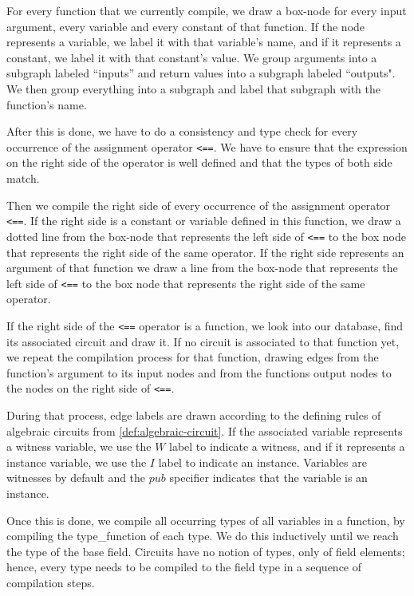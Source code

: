 For every function that we currently compile, we draw a box-node for every input argument, every variable and every constant of that function. If the node represents a variable, we label it with that variable's name, and if it represents a constant, we label it with that constant's value. We group arguments into a subgraph labeled ``inputs'' and return values into a subgraph labeled ``outputs". We then group everything into a subgraph and label that subgraph with the function's name.

After this is done, we have to do a consistency and type check for every occurrence of the assignment operator \texttt{<==}. We have to ensure that the expression on the right side of the operator is well defined and that the types of both side match.

Then we compile the right side of every occurrence of the assignment operator \texttt{<==}. If the right side is a constant or variable defined in this function, we draw a dotted line from the box-node that represents the left side of \texttt{<==} to the box node that represents the right side of the same operator. If the right side represents an argument of that function we draw a line from the box-node that represents the left side of \texttt{<==} to the box node that represents the right side of the same operator. 

If the right side of the \texttt{<==} operator is a function, we look into our database, find its associated circuit and draw it. If no circuit is  associated to that function yet, we repeat the compilation process for that function, drawing edges from the function's argument to its input nodes and from the functions output nodes to the nodes on the right side of \texttt{<==}.

During that process, edge labels are drawn according to the defining rules of algebraic circuits from \ref{def:algebraic-circuit}. If the associated variable represents a witness variable, we use the $W$ label to indicate a witness, and if it represents a instance variable, we use the $I$ label to indicate an instance. Variables are witnesses by default and the $pub$ specifier indicates that the variable is an instance.

Once this is done, we compile all occurring types of all variables in a function, by compiling the type\_function of each type. We do this inductively until we reach the type of the base field. Circuits have no notion of types, only of field elements; hence, every type needs to be compiled to the field type in a sequence of compilation steps.


